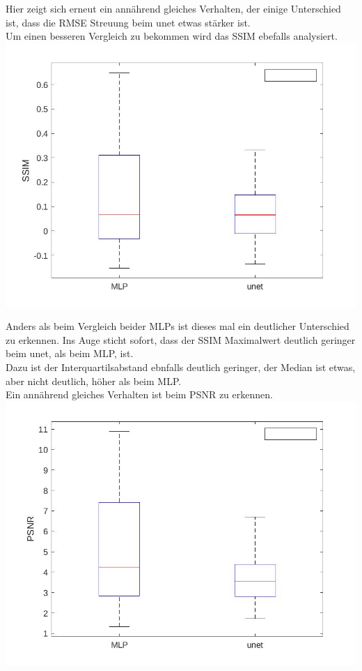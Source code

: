\documentclass[8pt,a4paper]{article}
\begin{document}
Hier zeigt sich erneut ein annährend gleiches Verhalten, der einige Unterschied ist, dass die RMSE Streuung beim unet etwas stärker ist.\\
\newpage
Um einen besseren Vergleich zu bekommen wird das SSIM ebefalls analysiert.\\

\includegraphics[scale=0.2]{boxplotUnetSSIM.jpg}

Anders als beim Vergleich beider MLPs ist dieses mal ein deutlicher Unterschied zu erkennen.
Ins Auge sticht sofort, dass der SSIM Maximalwert deutlich geringer beim unet, als beim MLP, ist.\\
Dazu ist der Interquartilsabstand ebnfalls deutlich geringer, der Median ist etwas, aber nicht deutlich, höher als beim MLP.\\

Ein annährend gleiches Verhalten ist beim PSNR zu erkennen.\\

\includegraphics[scale=0.2]{boxplotUnetPSNR.jpg}
\end{document}
